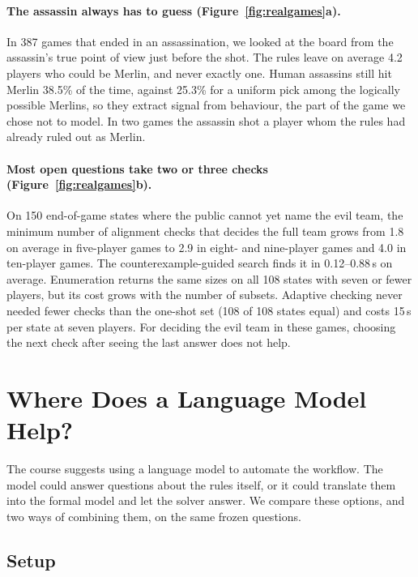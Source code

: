 \documentclass[runningheads]{llncs}
\begin{document}
\paragraph{The assassin always has to guess (Figure~\ref{fig:realgames}a).}
In 387 games that ended in an assassination, we looked at the board from the assassin's true point of view just before
the shot. The rules leave on average 4.2 players who could be Merlin, and never exactly one. Human assassins still hit
Merlin 38.5\% of the time, against 25.3\% for a uniform pick among the logically possible Merlins, so they extract
signal from behaviour, the part of the game we chose not to model. In two games the assassin shot a player whom the
rules had already ruled out as Merlin.

\paragraph{Most open questions take two or three checks (Figure~\ref{fig:realgames}b).}
On 150 end-of-game states where the public cannot yet name the evil team, the minimum number of alignment checks that
decides the full team grows from 1.8 on average in five-player games to 2.9 in eight- and nine-player games and 4.0 in
ten-player games. The counterexample-guided search finds it in 0.12--0.88\,s on average. Enumeration returns the same
sizes on all 108 states with seven or fewer players, but its cost grows with the number of subsets. Adaptive checking
never needed fewer checks than the one-shot set (108 of 108 states equal) and costs 15\,s per state at seven players.
For deciding the evil team in these games, choosing the next check after seeing the last answer does not help.

\section{Where Does a Language Model Help?}\label{sec:llm}
The course suggests using a language model to automate the workflow. The model could answer questions about the
rules itself, or it could translate them into the formal model and let the solver answer. We compare these options,
and two ways of combining them, on the same frozen questions.

\subsection{Setup}
\end{document}
